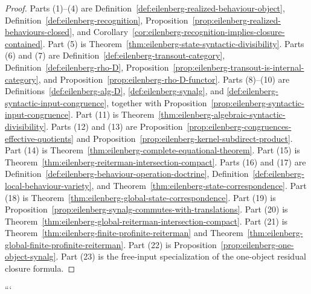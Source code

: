 \begin{proof}
Parts (1)--(4) are
Definition~\ref{def:eilenberg-realized-behaviour-object},
Definition~\ref{def:eilenberg-recognition},
Proposition~\ref{prop:eilenberg-realized-behaviours-closed}, and
Corollary~\ref{cor:eilenberg-recognition-implies-closure-contained}.
Part (5) is Theorem~\ref{thm:eilenberg-state-syntactic-divisibility}.
Parts (6) and (7) are
Definition~\ref{def:eilenberg-transout-category},
Definition~\ref{def:eilenberg-rho-D},
Proposition~\ref{prop:eilenberg-transout-is-internal-category}, and
Proposition~\ref{prop:eilenberg-rho-D-functor}.
Parts (8)--(10) are
Definitions~\ref{def:eilenberg-alg-D},
\ref{def:eilenberg-synalg}, and
\ref{def:eilenberg-syntactic-input-congruence}, together with
Proposition~\ref{prop:eilenberg-syntactic-input-congruence}.
Part (11) is
Theorem~\ref{thm:eilenberg-algebraic-syntactic-divisibility}.
Parts (12) and (13) are
Proposition~\ref{prop:eilenberg-congruences-effective-quotients} and
Proposition~\ref{prop:eilenberg-kernel-subdirect-product}.
Part (14) is
Theorem~\ref{thm:eilenberg-complete-equational-theorem}.
Part (15) is
Theorem~\ref{thm:eilenberg-reiterman-intersection-compact}.
Parts (16) and (17) are
Definition~\ref{def:eilenberg-behaviour-operation-doctrine},
Definition~\ref{def:eilenberg-local-behaviour-variety}, and
Theorem~\ref{thm:eilenberg-state-correspondence}.
Part (18) is
Theorem~\ref{thm:eilenberg-global-state-correspondence}.
Part (19) is
Proposition~\ref{prop:eilenberg-synalg-commutes-with-translations}.
Part (20) is
Theorem~\ref{thm:eilenberg-global-reiterman-intersection-compact}.
Part (21) is
Theorem~\ref{thm:eilenberg-finite-profinite-reiterman} and
Theorem~\ref{thm:eilenberg-global-finite-profinite-reiterman}.
Part (22) is
Proposition~\ref{prop:eilenberg-one-object-synalg}.
Part (23) is the free-input specialization of the one-object residual closure
formula.
\end{proof}
```
